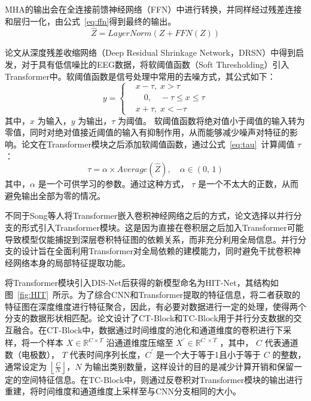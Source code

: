 MHA的输出会在全连接前馈神经网络（FFN）中进行转换，并同样经过残差连接和层归一化，由公式~\ref{eq:ffn}得到最终的输出。
\begin{equation}\label{eq:ffn}
    \hat{Z}=LayerNorm(Z+FFN(Z))
\end{equation}

论文从深度残差收缩网络（Deep Residual Shrinkage Network，DRSN）\cite{zhao2019deep}中得到启发，对于具有低信噪比的EEG数据，将软阈值函数（Soft Thresholding）引入Transformer中。软阈值函数是信号处理中常用的去噪方式\cite{wright2009sparse}，其公式如下：
\begin{equation}\label{eq:soft}
    y=\left\{
    \begin{aligned}
    & x-\tau, \; x>\tau \\
    & \quad0, \quad -\tau \le x \le \tau \\ 
    & x+\tau, \; x<-\tau
\end{aligned}
\right.
\end{equation}
其中，\(x\) 为输入，\(y\) 为输出，\(\tau\) 为阈值。
软阈值函数将绝对值小于阈值的输入转为零值，同时对绝对值接近阈值的输入有抑制作用，从而能够减少噪声对特征的影响。论文在Transformer模块之后添加软阈值函数，通过公式~\ref{eq:tau}~计算阈值 \(\tau\)：
\begin{equation}\label{eq:tau}
    \tau=\alpha \times Average(\hat{Z}),\quad \alpha \in (0,\,1)
\end{equation}
其中，\(\alpha\) 是一个可供学习的参数。通过这种方式，
\(\tau\) 是一个不太大的正数，从而避免输出全部为零的情况。

不同于Song等人将Transformer嵌入卷积神经网络之后的方式\cite{song2022eeg}，论文选择以并行分支的形式引入Transformer模块。这是因为直接在卷积层之后加入Transformer可能导致模型仅能捕捉到深层卷积特征图的依赖关系，而非充分利用全局信息。并行分支的设计旨在全面利用Transformer对全局依赖的建模能力，同时避免干扰卷积神经网络本身的局部特征提取功能。

将Transformer模块引入DIS-Net后获得的新模型命名为HIT-Net，其结构如图~\ref{fig:HIT}~所示。为了综合CNN和Transformer提取的特征信息，将二者获取的特征图在深度维度进行特征聚合，因此，有必要对数据进行一定的处理，使得两个分支的数据形状相匹配。论文设计了CT-Block和TC-Block用于并行分支数据的交互融合。在CT-Block中，数据通过时间维度的池化和通道维度的卷积进行下采样，将一个样本 \(X \in \mathbb{R}^{C \times T}\) 沿通道维度压缩至 \(X^{'} \in \mathbb{R}^{C^{'} \times T}\) ，其中， \(C\) 代表通道数（电极数）， \(T\) 代表时间序列长度，\(C^{'}\) 是一个大于等于1且小于等于 \(C\) 的整数，通常设定为 \(\left\lfloor \frac{C}{N} \right\rfloor\)，\(N\) 为输出类别数量，这样设计的目的是减少计算开销和保留一定的空间特征信息。在TC-Block中，则通过反卷积对Transformer模块的输出进行重建，将时间维度和通道维度上采样至与CNN分支相同的大小。

